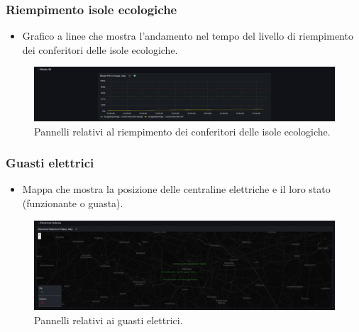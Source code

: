 \documentclass[8pt]{article}
\begin{document}
\subsubsection{Riempimento isole ecologiche}
\begin{itemize}
\setlength\itemsep{0em}
    \item Grafico a linee che mostra l'andamento nel tempo del livello di riempimento dei conferitori delle isole ecologiche.
\end{itemize}
\begin{figure}[H]
    \centering
    \includegraphics[width=15cm]{images_mu/waste_fill.png}
    \caption{Pannelli relativi al riempimento dei conferitori delle isole ecologiche.}
    \label{fig:Pannelli relativi al riempimento dei conferitori delle isole ecologiche}
\end{figure}
\subsubsection{Guasti elettrici}
\begin{itemize}
\setlength\itemsep{0em}
    \item Mappa che mostra la posizione delle centraline elettriche e il loro stato (funzionante o guasta).
\end{itemize}
\begin{figure}[H]
    \centering
    \includegraphics[width=15cm]{images_mu/electrical_failure.png}
    \caption{Pannelli relativi ai guasti elettrici.}
    \label{fig:Pannelli relativi ai guasti elettrici}
\end{figure}
\end{document}

